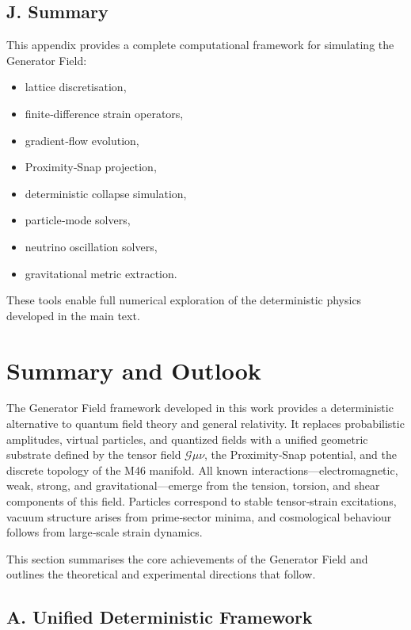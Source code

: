\documentclass[reprint,amsmath,amssymb,aps,prl,floatfix]{revtex4-2}
\begin{document}
\begin{itemize}
\subsection{J. Summary}

This appendix provides a complete computational framework for simulating the Generator Field:

\begin{itemize}
\item lattice discretisation,  
\item finite‑difference strain operators,  
\item gradient‑flow evolution,  
\item Proximity‑Snap projection,  
\item deterministic collapse simulation,  
\item particle‑mode solvers,  
\item neutrino oscillation solvers,  
\item gravitational metric extraction.
\end{itemize}

These tools enable full numerical exploration of the deterministic physics developed in the main text.

\section{Summary and Outlook}

The Generator Field framework developed in this work provides a deterministic alternative to quantum field theory and general relativity. It replaces probabilistic amplitudes, virtual particles, and quantized fields with a unified geometric substrate defined by the tensor field \(\mathcal{G}{\mu\nu}\), the Proximity‑Snap potential, and the discrete topology of the M46 manifold. All known interactions—electromagnetic, weak, strong, and gravitational—emerge from the tension, torsion, and shear components of this field. Particles correspond to stable tensor‑strain excitations, vacuum structure arises from prime‑sector minima, and cosmological behaviour follows from large‑scale strain dynamics.

This section summarises the core achievements of the Generator Field and outlines the theoretical and experimental directions that follow.

\subsection{A. Unified Deterministic Framework}


\end{itemize}
\end{document}
